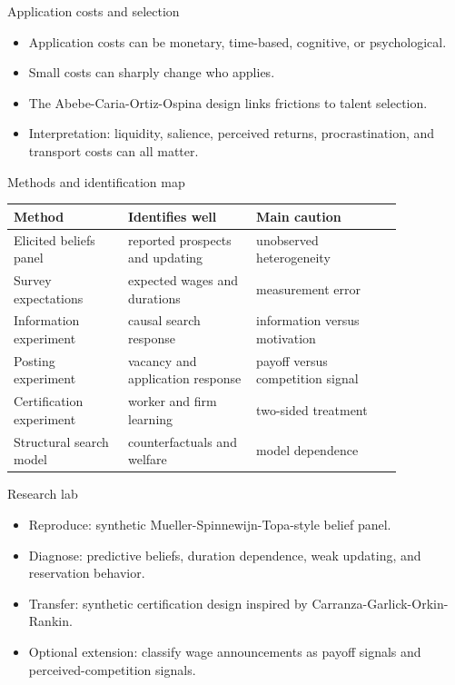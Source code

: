 \documentclass[aspectratio=169,11pt]{beamer}
\begin{document}
\begin{frame}{Application costs and selection}
\begin{itemize}
    \item Application costs can be monetary, time-based, cognitive, or psychological.
    \item Small costs can sharply change who applies.
    \item The Abebe-Caria-Ortiz-Ospina design links frictions to talent selection.
    \item Interpretation: liquidity, salience, perceived returns, procrastination, and transport costs can all matter.
\end{itemize}
\end{frame}

\begin{frame}{Methods and identification map}
\scriptsize
\begin{tabular}{p{0.25\linewidth} p{0.28\linewidth} p{0.32\linewidth}}
\toprule
Method & Identifies well & Main caution \\
\midrule
Elicited beliefs panel & reported prospects and updating & unobserved heterogeneity \\
Survey expectations & expected wages and durations & measurement error \\
Information experiment & causal search response & information versus motivation \\
Posting experiment & vacancy and application response & payoff versus competition signal \\
Certification experiment & worker and firm learning & two-sided treatment \\
Structural search model & counterfactuals and welfare & model dependence \\
\bottomrule
\end{tabular}
\end{frame}

\begin{frame}{Research lab}
\begin{itemize}
    \item Reproduce: synthetic Mueller-Spinnewijn-Topa-style belief panel.
    \item Diagnose: predictive beliefs, duration dependence, weak updating, and reservation behavior.
    \item Transfer: synthetic certification design inspired by Carranza-Garlick-Orkin-Rankin.
    \item Optional extension: classify wage announcements as payoff signals and perceived-competition signals.
\end{itemize}
\end{frame}
\end{document}
